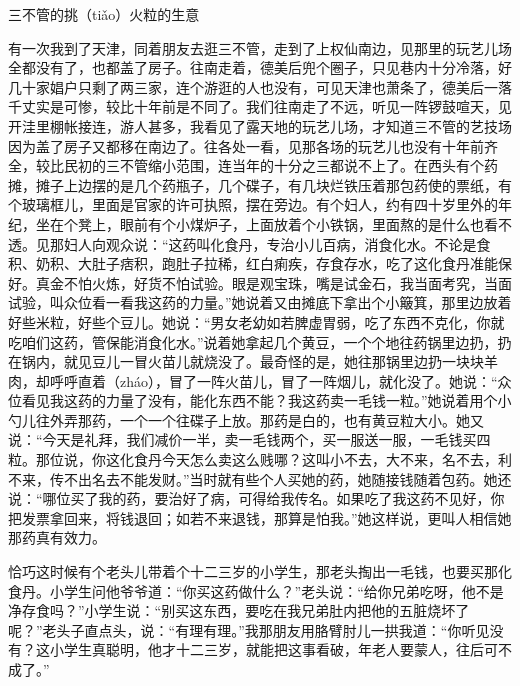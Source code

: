 \documentclass[12pt,UTF8]{ctexbook}
\begin{document}
三不管的挑（tiǎo）火粒的生意


有一次我到了天津，同着朋友去逛三不管，走到了上权仙南边，见那里的玩艺儿场全都没有了，也都盖了房子。往南走着，德美后兜个圈子，只见巷内十分冷落，好几十家娼户只剩了两三家，连个游逛的人也没有，可见天津也萧条了，德美后一落千丈实是可惨，较比十年前是不同了。我们往南走了不远，听见一阵锣鼓喧天，见开洼里棚帐接连，游人甚多，我看见了露天地的玩艺儿场，才知道三不管的艺技场因为盖了房子又都移在南边了。往各处一看，见那各场的玩艺儿也没有十年前齐全，较比民初的三不管缩小范围，连当年的十分之三都说不上了。在西头有个药摊，摊子上边摆的是几个药瓶子，几个碟子，有几块烂铁压着那包药使的票纸，有个玻璃框儿，里面是官家的许可执照，摆在旁边。有个妇人，约有四十岁里外的年纪，坐在个凳上，眼前有个小煤炉子，上面放着个小铁锅，里面熬的是什么也看不透。见那妇人向观众说：“这药叫化食丹，专治小儿百病，消食化水。不论是食积、奶积、大肚子痞积，跑肚子拉稀，红白痢疾，存食存水，吃了这化食丹准能保好。真金不怕火炼，好货不怕试验。眼是观宝珠，嘴是试金石，我当面考究，当面试验，叫众位看一看我这药的力量。”她说着又由摊底下拿出个小簸箕，那里边放着好些米粒，好些个豆儿。她说：“男女老幼如若脾虚胃弱，吃了东西不克化，你就吃咱们这药，管保能消食化水。”说着她拿起几个黄豆，一个个地往药锅里边扔，扔在锅内，就见豆儿一冒火苗儿就烧没了。最奇怪的是，她往那锅里边扔一块块羊肉，却呼呼直着（zháo），冒了一阵火苗儿，冒了一阵烟儿，就化没了。她说：“众位看见我这药的力量了没有，能化东西不能？我这药卖一毛钱一粒。”她说着用个小勺儿往外弄那药，一个一个往碟子上放。那药是白的，也有黄豆粒大小。她又说：“今天是礼拜，我们减价一半，卖一毛钱两个，买一服送一服，一毛钱买四粒。那位说，你这化食丹今天怎么卖这么贱哪？这叫小不去，大不来，名不去，利不来，传不出名去不能发财。”当时就有些个人买她的药，她随接钱随着包药。她还说：“哪位买了我的药，要治好了病，可得给我传名。如果吃了我这药不见好，你把发票拿回来，将钱退回；如若不来退钱，那算是怕我。”她这样说，更叫人相信她那药真有效力。

恰巧这时候有个老头儿带着个十二三岁的小学生，那老头掏出一毛钱，也要买那化食丹。小学生问他爷爷道：“你买这药做什么？”老头说：“给你兄弟吃呀，他不是净存食吗？”小学生说：“别买这东西，要吃在我兄弟肚内把他的五脏烧坏了呢？”老头子直点头，说：“有理有理。”我那朋友用胳臂肘儿一拱我道：“你听见没有？这小学生真聪明，他才十二三岁，就能把这事看破，年老人要蒙人，往后可不成了。”
\end{document}
